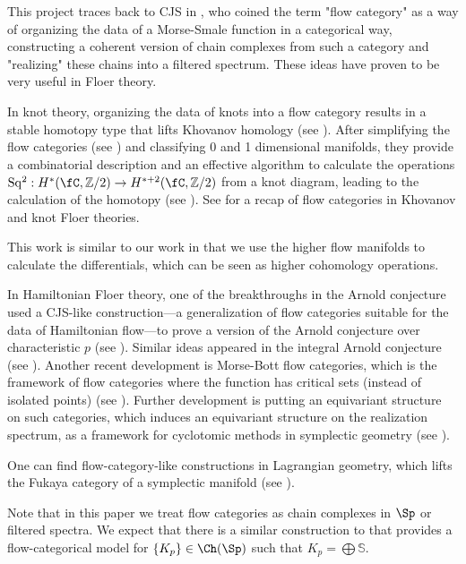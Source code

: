 This project traces back to CJS in \cite{CJS95}, who coined the term "flow category" as a way of organizing the data of a Morse-Smale function in a categorical way, constructing a coherent version of chain complexes from such a category and "realizing" these chains into a filtered spectrum. These ideas have proven to be very useful in Floer theory.

In knot theory, organizing the data of knots into a flow category results in a stable homotopy type that lifts Khovanov homology (see \cite{LS14}). After simplifying the flow categories (see \cite{lobb2018framed, lobb2017calculus}) and classifying 0 and 1 dimensional manifolds, they provide a combinatorial description and an effective algorithm to calculate the operations $\mathrm{Sq^2}: H^\ast(\fC, \mathbb{Z}/2) \to H^{\ast+2}(\fC, \mathbb{Z}/2)$ from a knot diagram, leading to the calculation of the homotopy (see \cite{lobb2020khovanov, lipshitz2014steenrod}). See \cite{marengon2024spectra} for a recap of flow categories in Khovanov and knot Floer theories.

This work is similar to our work in that we use the higher flow manifolds to calculate the differentials, which can be seen as higher cohomology operations.

In Hamiltonian Floer theory, one of the breakthroughs in the Arnold conjecture used a CJS-like construction—a generalization of flow categories suitable for the data of Hamiltonian flow—to prove a version of the Arnold conjecture over characteristic $p$ (see \cite{abouzaid2021arnold}). Similar ideas appeared in the integral Arnold conjecture (see \cite{rezchikov2022integral, bai2022arnold}).
Another recent development is Morse-Bott flow categories, which is the framework of flow categories where the function has critical sets (instead of isolated points) (see \cite{bonciocat2024revisiting}). Further development is putting an equivariant structure on such categories, which induces an equivariant structure on the realization spectrum, as a framework for cyclotomic methods in symplectic geometry (see \cite{cote2023equivariant, rezchikov2024cyclotomic}).

One can find flow-category-like constructions in Lagrangian geometry, which lifts the Fukaya category of a symplectic manifold (see \cite{porcelli2024bordism, porcelli2024spectral}).

\begin{rem}
    Note that in this paper we treat flow categories as chain complexes in $\Sp$ or filtered spectra. We expect that there is a similar construction to \cite{abouzaid2024foundation} that provides a flow-categorical model for $\{K_p\} \in \Ch(\Sp)$ such that $K_p = \bigoplus \mathbb{S}$.
\end{rem}

